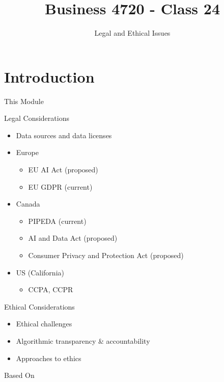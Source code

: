 \documentclass[ignorenonframetext,xcolor=x11names]{beamer}
\title{Business 4720 - Class 24}
\subtitle{Legal and Ethical Issues}
\begin{document}
\begin{frame}{}
  \titlepage
  \footnotesize
  
\end{frame}

\section{Introduction}

\begin{frame}{This Module}

\begin{block}{Legal Considerations}
  \begin{itemize}
     \item Data sources and data licenses
     \item Europe
     \begin{itemize}
         \item EU AI Act (proposed)
         \item EU GDPR (current)
     \end{itemize}
     \item Canada
     \begin{itemize}
         \item PIPEDA (current)
         \item AI and Data Act (proposed)
         \item Consumer Privacy and Protection Act (proposed)
     \end{itemize}
     \item US (California)
     \begin{itemize}
        \item CCPA, CCPR
     \end{itemize}
  \end{itemize}
\end{block}
\begin{block}{Ethical Considerations}
  \begin{itemize}
     \item Ethical challenges
     \item Algorithmic transparency \& accountability
     \item Approaches to ethics
  \end{itemize}
\end{block}
\end{frame}

\begin{frame}{Based On}
\end{frame}
\end{document}
